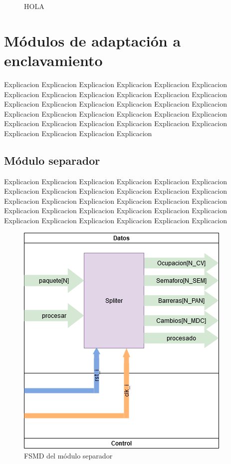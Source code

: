 	\begin{figure}[h]
	\centering
		\caption{HOLA}
		\label{fig:hola}
	\end{figure}
	
\section{Módulos de adaptación a enclavamiento}

	Explicacion Explicacion Explicacion Explicacion Explicacion Explicacion Explicacion Explicacion Explicacion Explicacion Explicacion Explicacion Explicacion Explicacion Explicacion Explicacion Explicacion Explicacion Explicacion Explicacion Explicacion Explicacion Explicacion Explicacion Explicacion Explicacion Explicacion Explicacion Explicacion Explicacion Explicacion Explicacion Explicacion Explicacion 
	 
	\subsection{Módulo separador}
	
		Explicacion Explicacion Explicacion Explicacion Explicacion Explicacion Explicacion Explicacion Explicacion Explicacion Explicacion Explicacion Explicacion Explicacion Explicacion Explicacion Explicacion Explicacion Explicacion Explicacion Explicacion Explicacion Explicacion Explicacion Explicacion Explicacion Explicacion Explicacion Explicacion Explicacion 
		
		\begin{figure}[h]
		\centering
			\includegraphics[scale=.5]{./Figures/FSMD-Separador}
			\caption{FSMD del módulo separador}
			\label{fig:FSMD_Separador}
		\end{figure}
		

